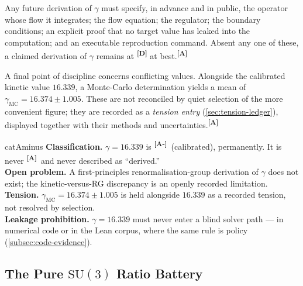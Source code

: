 \documentclass[12pt,a4paper,twoside]{article}
\theoremstyle{plain}
\theoremstyle{definition}
\theoremstyle{remark}
\newcommand{\catmark}[1]{\textsuperscript{\textsf{\textbf{[#1]}}}}
\newcommand{\GammaGeom}{16.339} %
\newcommand{\GammaMC}{16.374 \pm 1.005} %
\begin{document}
\noindent Any future derivation of $\gamma$ must specify, in advance and
in public, the operator whose flow it integrates; the flow equation; the
regulator; the boundary conditions; an explicit proof that no target
value has leaked into the computation; and an executable reproduction
command. Absent any one of these, a claimed derivation of $\gamma$
remains at \catmark{D} at best.\catmark{A}

A final point of discipline concerns conflicting values. Alongside the
calibrated kinetic value $16.339$, a Monte-Carlo determination yields a
mean of $\gamma_{\mathrm{MC}} = \GammaMC$. These are not reconciled by
quiet selection of the more convenient figure; they are recorded as a
\emph{tension entry} (\cref{sec:tension-ledger}), displayed together
with their methods and uncertainties.\catmark{A}

\begin{evidencebox}{catAminus}
\textbf{Classification.} $\gamma = \GammaGeom$ is \catmark{A-}\
(calibrated), permanently. It is never \catmark{A}\ and never described
as ``derived.''\\[0.3em]
\textbf{Open problem.} A first-principles renormalisation-group
derivation of $\gamma$ does not exist; the kinetic-versus-RG discrepancy
is an openly recorded limitation.\\[0.3em]
\textbf{Tension.} $\gamma_{\mathrm{MC}} = \GammaMC$ is held alongside
$16.339$ as a recorded tension, not resolved by selection.\\[0.3em]
\textbf{Leakage prohibition.} $\gamma = 16.339$ must never enter a blind
solver path --- in numerical code or in the Lean corpus, where the same
rule is policy (\cref{subsec:code-evidence}).
\end{evidencebox}

\subsection{The Pure \texorpdfstring{$\mathrm{SU}(3)$}{SU(3)} Ratio Battery}
\label{subsec:ratio-battery}
\end{document}
